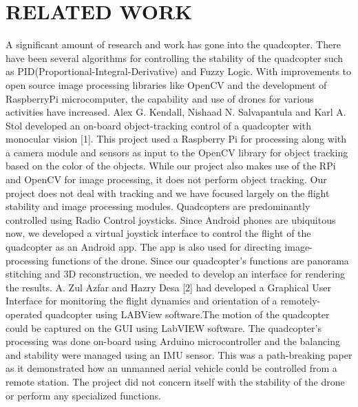 \chapter{RELATED WORK} %
A significant amount of research and work has gone into the quadcopter. There have been several algorithms for controlling the stability of the quadcopter such as PID(Proportional-Integral-Derivative) and Fuzzy Logic. With improvements to open source image processing libraries like OpenCV and the development of RaspberryPi microcomputer, the capability and use of drones for various activities have increased.
\newline
\newline
 Alex G. Kendall, Nishaad N. Salvapantula and Karl A. Stol developed an on-board object-tracking control of a quadcopter with monocular vision [1]. This project used a Raspberry Pi for processing along with a camera module and sensors as input to the OpenCV library for object tracking based on the color of the objects.
 \newline
  While our project also makes use of the RPi and OpenCV for image processing, it does not perform object tracking. Our project does not deal with tracking and we have focused largely on the flight stability and image processing modules.
\newline
\newline
Quadcopters are predominantly controlled using Radio Control joysticks. Since Android phones are ubiquitous now, we developed a virtual joystick interface to control the flight of the quadcopter as an Android app. The app is also used for directing image-processing functions of the drone. 
\newline
Since our quadcopter's functions are panorama stitching and 3D reconstruction, we needed to develop an interface for rendering the results.  A. Zul Azfar and Hazry Desa [2] had developed a Graphical User Interface for monitoring the flight dynamics and orientation of a remotely-operated quadcopter using LABView software.The motion of the quadcopter could be captured on the GUI using LabVIEW software. 
\newline
The quadcopter’s processing was done on-board using Arduino microcontroller and the balancing and stability were managed using an IMU sensor. This was a path-breaking paper as it demonstrated how an unmanned aerial vehicle could be controlled from a remote station. The project did not concern itself with the stability of the drone or perform any specialized functions.
